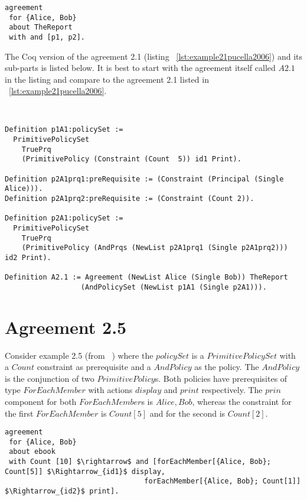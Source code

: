 \lstset{language=Pucella2006}
\begin{lstlisting}[frame=single, caption={Agreement 2.1 (as used in ~\cite{pucella2006})},label={lst:example21pucella2006}]
agreement
 for {Alice, Bob} 
 about TheReport 
 with and [p1, p2].
\end{lstlisting}

The Coq version of the agreement 2.1 (listing ~\ref{lst:example21pucella2006}) and its sub-parts is listed below. It is best to start with the agreement itself called $A2.1$ in the listing and compare to the agreement 2.1 listed in ~\ref{lst:example21pucella2006}.

\lstset{language=Coq}
\begin{minipage}[c]{0.95\textwidth}
\begin{lstlisting}[frame=single, caption={Agreement 2.1 in Coq},label={lst:example21}]


Definition p1A1:policySet :=
  PrimitivePolicySet
    TruePrq
    (PrimitivePolicy (Constraint (Count  5)) id1 Print).

Definition p2A1prq1:preRequisite := (Constraint (Principal (Single Alice))).
Definition p2A1prq2:preRequisite := (Constraint (Count 2)).

Definition p2A1:policySet :=
  PrimitivePolicySet
    TruePrq
    (PrimitivePolicy (AndPrqs (NewList p2A1prq1 (Single p2A1prq2))) id2 Print).

Definition A2.1 := Agreement (NewList Alice (Single Bob)) TheReport
                  (AndPolicySet (NewList p1A1 (Single p2A1))).

\end{lstlisting}                  
\end{minipage}

\section{Agreement 2.5}

Consider example 2.5 (from ~\cite{pucella2006}) where the $policySet$ is a $PrimitivePolicySet$ with a $Count$ constraint as prerequisite and a $AndPolicy$ as the policy. The $AndPolicy$ is the conjunction of two $PrimitivePolicy$s. Both policies have prerequisites of type $ForEachMember$ with actions $display$ and $print$ respectively. The $prin$ component for both $ForEachMember$s is ${Alice, Bob}$, whereas the constraint for the first $ForEachMember$ is $Count[5]$ and for the second is $Count[2]$.

\lstset{language=Pucella2006}
\begin{lstlisting}[frame=single, caption={Agreement 2.5 (as used in ~\cite{pucella2006})},label={lst:example25pucella2006}]
agreement
 for {Alice, Bob} 
 about ebook 
 with Count [10] $\rightarrow$ and [forEachMember[{Alice, Bob}; Count[5]] $\Rightarrow_{id1}$ display,
                                 forEachMember[{Alice, Bob}; Count[1]] $\Rightarrow_{id2}$ print].
\end{lstlisting}

